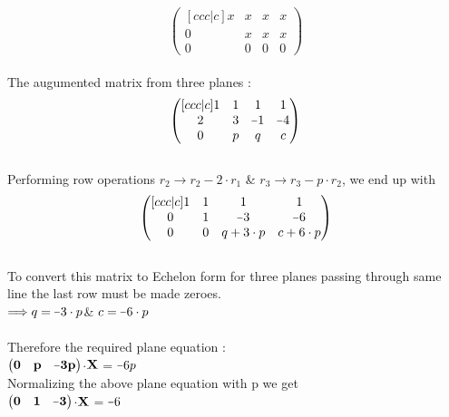 \documentclass[twocolumn]{article}
\let\vec\mathbf
\newcommand*{\matminus}{%
  \leavevmode
  \hphantom{0}%
  \llap{%
    \settowidth{\dimen0 }{$0$}%
    \resizebox{1.1\dimen0 }{\height}{$-$}%
  }%
}
\begin{document}
$$\begin{pmatrix}[ccc|c]
 x & x & x & x\\  0 & x & x & x \\ 0 & 0 & 0 & 0
\end{pmatrix}$$
\\The augumented matrix from three planes :
$$\begin{pmatrix}[ccc|c]
 1 & 1 & 1 & 1\\  2 & 3 & \matminus1 & \matminus4 \\ 0 & p & q & c
\end{pmatrix}$$
\\ Performing row operations  $r_2 \rightarrow r_2-2\cdot r_1$ \&  $r_3 \rightarrow r_3-p\cdot r_2$, we end up with
\\$$\begin{pmatrix}[ccc|c]
 1 & 1 & 1 & 1\\  0 & 1 & \matminus3 & \matminus6 \\ 0 & 0 & q +3\cdot p & c +6\cdot p
\end{pmatrix}$$
\\To convert this matrix to Echelon form for three planes passing through same line the last row must be made zeroes.
\\\hspace*{1cm} $\Longrightarrow q=\matminus3\cdot p $\hspace*{0.5cm}\&\hspace*{0.5cm} $c=\matminus6\cdot p$
\\
\\Therefore the required plane equation : \\\hspace*{2cm}$\begin{pmatrix}{\bf0}&{\bf p}&{\bf \matminus 3p }\end{pmatrix}$$\cdot$${\bf \vec{X}}$ = $\matminus6p$
\\Normalizing the above plane equation with p we get
\\\hspace*{2.2cm}$\begin{pmatrix}{\bf0}&{\bf 1}&{\bf \matminus 3 }\end{pmatrix}$$\cdot$${\bf \vec{X}}$ = $\matminus6$
\end{document}
